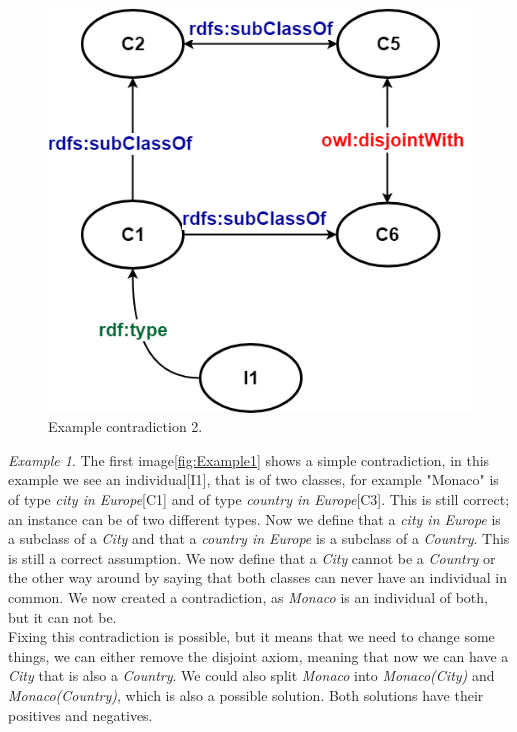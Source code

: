 \documentclass[11pt,letterpaper ,oneside ]{book}
\begin{document}
	\begin{figure}
		\centering
		\includegraphics[width=\linewidth]{images/Example2.png}
		\caption{Example contradiction 2.}
		\label{fig:Example2}
	\end{figure}
	
	\textit{Example 1}. The first image\ref{fig:Example1} shows a simple contradiction, in this example we see an individual[I1], that is of two classes, for example "Monaco" is of type \textit{city in Europe}[C1] and of type \textit{country in Europe}[C3]. This is still correct; an instance can be of two different types. Now we define that a \textit{city in Europe} is a subclass of a \textit{City} and that a \textit{country in Europe} is a subclass of a \textit{Country}. This is still a correct assumption. We now define that a \textit{City} cannot be a \textit{Country} or the other way around by saying that both classes can never have an individual in common. We now created a contradiction, as \textit{Monaco} is an individual of both, but it can not be.\\
	
	Fixing this contradiction is possible, but it means that we need to change some things, we can either remove the disjoint axiom, meaning that now we can have a \textit{City} that is also a \textit{Country}. We could also split \textit{Monaco} into \textit{Monaco(City)} and \textit{Monaco(Country)}, which is also a possible solution. Both solutions have their positives and negatives.\\
	
\end{document}

